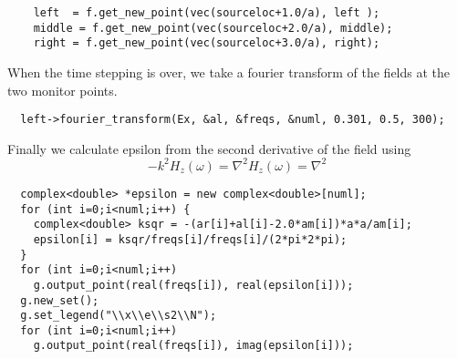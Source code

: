 \begin{verbatim}
    left  = f.get_new_point(vec(sourceloc+1.0/a), left );
    middle = f.get_new_point(vec(sourceloc+2.0/a), middle);
    right = f.get_new_point(vec(sourceloc+3.0/a), right);
\end{verbatim}
\begin{comment}
    f.step();
  }
  grace g("eps", dirname);
  complex<double> *al, *ar, *am, *freqs;
  int numl, numr;
  master_printf("Working on left fourier transform...\n");
\end{comment}
When the time stepping is over, we take a fourier transform of the fields
at the two monitor points.
\begin{verbatim}
  left->fourier_transform(Ex, &al, &freqs, &numl, 0.301, 0.5, 300);
\end{verbatim}
\begin{comment}
  delete[] freqs;
  master_printf("Working on middle fourier transform...\n");
  middle->fourier_transform(Ex, &am, &freqs, &numr, 0.301, 0.5, 300);
  delete[] freqs;
  master_printf("Working on right fourier transform...\n");
  right->fourier_transform(Ex, &ar, &freqs, &numr, 0.301, 0.5, 300);
  if (numl != numr)
     master_printf("Aaack you need both nums to be the same!\n");
  g.new_set();
  g.set_legend("\\x\\e\\s1\\N");
\end{comment}
Finally we calculate epsilon from the second derivative of the field using
\begin{equation*}
-k^2 H_z(\omega) = \nabla^2 H_z(\omega) = \nabla^2
\end{equation*}
\begin{verbatim}
  complex<double> *epsilon = new complex<double>[numl];
  for (int i=0;i<numl;i++) {
    complex<double> ksqr = -(ar[i]+al[i]-2.0*am[i])*a*a/am[i];
    epsilon[i] = ksqr/freqs[i]/freqs[i]/(2*pi*2*pi);
  } 
  for (int i=0;i<numl;i++)
    g.output_point(real(freqs[i]), real(epsilon[i]));
  g.new_set();
  g.set_legend("\\x\\e\\s2\\N");
  for (int i=0;i<numl;i++)
    g.output_point(real(freqs[i]), imag(epsilon[i]));
\end{verbatim}
\begin{comment}
  g.new_set();
  g.set_legend("analytic \\x\\e\\s1\\N");
  for (int i=0;i<numl;i++)
    g.output_point(real(freqs[i]),
                   real(f.analytic_epsilon(real(freqs[i]),vec(sourceloc+3.0/a))));
  g.new_set();
  g.set_legend("analytic \\x\\e\\s2\\N");
  for (int i=0;i<numl;i++)
    g.output_point(real(freqs[i]),
                   imag(f.analytic_epsilon(real(freqs[i]),vec(sourceloc+3.0/a))));
}
\end{comment}



